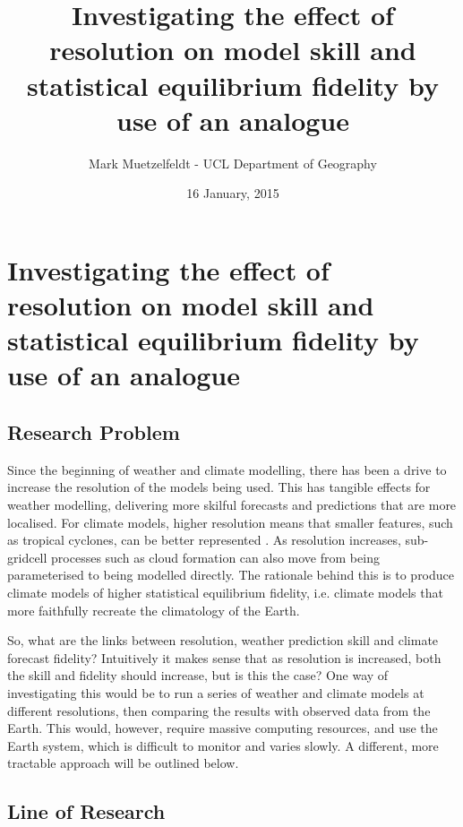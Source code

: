 \documentclass[12pt,a4paper]{article}
\title{Investigating the effect of resolution on model skill and statistical equilibrium fidelity by use of an analogue}
\author{Mark Muetzelfeldt - UCL Department of Geography}
\date{16 January, 2015}
\newcommand{\ts}{\textsuperscript}
\begin{document}
\section*{Investigating the effect of resolution on model skill and statistical equilibrium fidelity by use of an analogue}




\subsection*{Research Problem}

Since the beginning of weather and climate modelling, there has been a drive to increase the
resolution of the models being used. This has tangible effects for weather modelling, delivering
more skilful forecasts \cite{buizza2003benefits} and predictions that are more localised. For
climate models, higher resolution means that smaller features, such as tropical cyclones, can be
better represented \cite{bengtsson1995hurricane}. As resolution increases, sub-gridcell processes
such as cloud formation can also move from being parameterised to being modelled directly. The
rationale behind this is to produce climate models of higher statistical equilibrium fidelity, i.e.
climate models that more faithfully recreate the climatology of the Earth.

So, what are the links between resolution, weather prediction skill and climate forecast fidelity?
Intuitively it makes sense that as resolution is increased, both the skill and fidelity should
increase, but is this the case? One way of investigating this would be to run a series of weather
and climate models at different resolutions, then comparing the results with observed data from the
Earth. This would, however, require massive computing resources, and use the Earth system, which is
difficult to monitor and varies slowly. A different, more tractable approach will be outlined below.

\subsection*{Line of Research}
\end{document}
